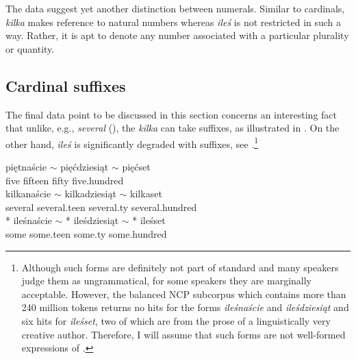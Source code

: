 \documentclass[output=paper, newtxmath, colorlinks, citecolor=brown]{langsci/langscibook}
\begin{document}
\noindent The data suggest yet another distinction between  numerals. Similar to cardinals, \textit{kilka} makes reference to natural numbers whereas \textit{ileś} is not restricted in such a way. Rather, it is apt to denote any number associated with a particular plurality or quantity.

	\subsection{Cardinal suffixes}\label{sec:cardinal-suffixes}

	The final data point to be discussed in this section concerns an interesting fact that unlike, e.g.,  \textit{several} (\citealt{kayne2007several}), the   \textit{kilka} can take  suffixes, as illustrated in . On the other hand, \textit{ileś} is significantly degraded with  suffixes, see .\footnote{Although such forms are definitely not part of standard  and many speakers judge them as ungrammatical, for some speakers they are marginally acceptable. However, the balanced NCP subcorpus which contains more than 240 million tokens returns no hits for the forms \textit{ileśnaście} and \textit{ileśdziesiąt} and six hits for \textit{ileśset}, two of which are from the prose of a linguistically very creative author. Therefore, I will assume that such forms are not well-formed expressions of .}


	\ea \label{ex:cardinal-suffixes} \ea {} {{pięt}naście $\sim$} {{pięć}dziesiąt $\sim$} {pięć}set\\
	five fifteen fifty five.hundred\\
	\ex {} {{kilka}naście $\sim$} {{kilka}dziesiąt $\sim$} {kilka}set\label{ex:cardinal-suffixes-kilka} \\
	several several.teen several.ty several.hundred\\
	\ex {} *\hspace{-2pt} {{ileś}naście $\sim$} *\hspace{-2pt} {{ileś}dziesiąt $\sim$} *\hspace{-2pt} {ileś}set\label{ex:cardinal-suffixes-iles} \\
	some {} some.teen {} some.ty {} some.hundred\\
	\z
    \z
\end{document}
